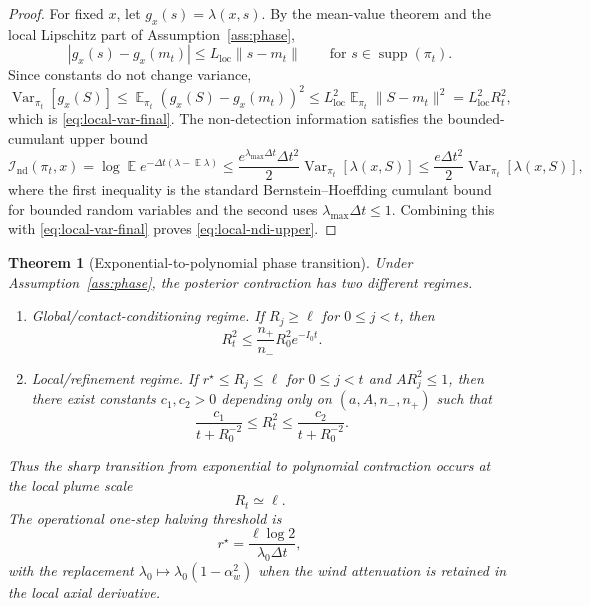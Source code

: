 \documentclass[11pt]{article}
\newtheorem{theorem}{Theorem}
\DeclareMathOperator{\E}{\mathbb{E}}
\DeclareMathOperator{\Var}{\mathrm{Var}}
\DeclareMathOperator{\supp}{\mathrm{supp}}
\newcommand{\dt}{\Delta t}
\begin{document}
\begin{proof}
For fixed $x$, let $g_x(s)=\lambda(x,s)$.  By the mean-value theorem and the local Lipschitz part of Assumption~\ref{ass:phase},
\[
        |g_x(s)-g_x(m_t)|
        \leq
        L_{\mathrm{loc}}\|s-m_t\|
        \qquad \text{for }s\in\supp(\pi_t).
\]
Since constants do not change variance,
\[
        \Var_{\pi_t}[g_x(S)]
        \leq
        \E_{\pi_t}\left(g_x(S)-g_x(m_t)\right)^2
        \leq
        L_{\mathrm{loc}}^2\E_{\pi_t}\|S-m_t\|^2
        =
        L_{\mathrm{loc}}^2R_t^2,
\]
which is \eqref{eq:local-var-final}.  The non-detection information satisfies the bounded-cumulant upper bound
\[
        \mathcal{I}_{\mathrm{nd}}(\pi_t,x)
        =
        \log\E e^{-\dt(\lambda-\E\lambda)}
        \leq
        \frac{e^{\lambda_{\max}\dt}\dt^2}{2}\Var_{\pi_t}[\lambda(x,S)]
        \leq
        \frac{e\dt^2}{2}\Var_{\pi_t}[\lambda(x,S)],
\]
where the first inequality is the standard Bernstein--Hoeffding cumulant bound for bounded random variables and the second uses $\lambda_{\max}\dt\leq1$.  Combining this with \eqref{eq:local-var-final} proves \eqref{eq:local-ndi-upper}.
\end{proof}

\begin{theorem}[Exponential-to-polynomial phase transition]\label{thm:p2-phase-transition}
Under Assumption~\ref{ass:phase}, the posterior contraction has two different regimes.
\begin{enumerate}
\item \emph{Global/contact-conditioning regime.}  If $R_j\geq\ell$ for $0\leq j<t$, then
\begin{equation}
        R_t^2
        \leq
        \frac{n_+}{n_-}R_0^2e^{-I_0t}.
        \label{eq:global-exponential}
\end{equation}
\item \emph{Local/refinement regime.}  If $r^\star\leq R_j\leq\ell$ for $0\leq j<t$ and $AR_j^2\leq1$, then there exist constants $c_1,c_2>0$ depending only on
$(a,A,n_-,n_+)$ such that
\begin{equation}
        \frac{c_1}{t+R_0^{-2}}
        \leq
        R_t^2
        \leq
        \frac{c_2}{t+R_0^{-2}} .
        \label{eq:local-polynomial}
\end{equation}
\end{enumerate}
Thus the sharp transition from exponential to polynomial contraction occurs at the local plume scale
\[
        R_t\simeq \ell .
\]
The operational one-step halving threshold is
\begin{equation}
        r^\star
        =
        \frac{\ell\log 2}{\lambda_0\dt},
        \label{eq:r-star}
\end{equation}
with the replacement $\lambda_0\mapsto \lambda_0(1-\alpha_w^2)$ when the wind attenuation is retained in the local axial derivative.
\end{theorem}
\end{document}

